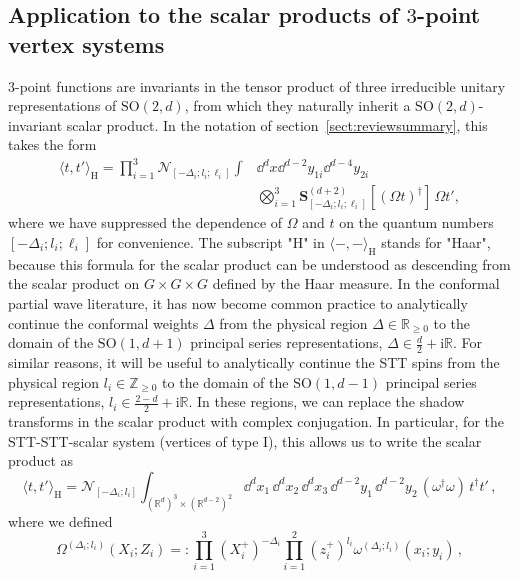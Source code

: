 \documentclass{article}
\def \Dg {\Delta}
\def \Zs {\mathbb{Z}}
\def \Rs {\mathbb{R}}
\begin{document}
\subsection{Application to the scalar products of \texorpdfstring{$3$}{3}-point vertex systems}
$3$-point functions are invariants in the tensor product of three irreducible unitary representations of $\mathrm{SO}(2,d)$, from which they naturally inherit a $\mathrm{SO}(2,d)$-invariant scalar product. In the notation of section~\ref{sect:reviewsummary}, this takes the form
\begin{align*}
    \langle t, t' \rangle_{\mathrm{H}} = \prod_{i=1}^3 \mathcal{N}_{[-\Dg_i;l_i;\ell_i]} \int & \dd^dx\dd^{d-2} y_{1i} \dd^{d-4} y_{2i}  \\
    & \bigotimes_{i=1}^3 \mathbf{S}^{(d+2)}_{[-\Dg_i;l_i;\ell_i]} \left[(\Omega t)^{\dagger}\right] \,  \Omega t',
\end{align*}
where we have suppressed the dependence of $\Omega$ and $t$ on the quantum numbers $[-\Dg_i;l_i;\ell_i]$ for convenience. The subscript "H" in $\langle -,-\rangle_{\mathrm{H}}$ stands for "Haar", because this formula for the scalar product can be understood as descending from the scalar product on $G\times G \times G$ defined by the Haar measure. In the conformal partial wave literature, it has now become common practice to analytically continue the conformal weights $\Dg$ from the physical region $\Dg \in \Rs_{\geq 0}$ to the domain of the $\mathrm{SO}(1,d+1)$ principal series representations, $\Dg \in \frac{d}{2}+ \mathrm{i} \Rs$. For similar reasons, it will be useful to analytically continue the STT spins from the physical region $l_i \in \Zs_{\geq 0}$ to the domain of the $\mathrm{SO}(1,d-1)$ principal series representations, $l_i \in \frac{2-d}{2}+\mathrm{i} \Rs$. In these regions, we can replace the shadow transforms in the scalar product with complex conjugation. In particular, for the STT-STT-scalar system (vertices of type I), this allows us to write the scalar product as
\begin{equation}
    \langle t, t' \rangle_{\mathrm{H}} = \mathcal{N}_{[-\Dg_i;l_i]} \int_{(\Rs^d)^3 \times (\Rs^{d-2})^2}  \dd^d x_1\,\dd^d x_2\,\dd^dx_3\,\dd^{d-2}y_1\,\dd^{d-2}y_2 \, (\omega^{\dagger} \omega) \, t^{\dagger}t'\,,
    \label{basicSP}
\end{equation}
where we defined
\begin{equation}
    \Omega^{(\Dg_i;l_i)}(X_i;Z_i) =: \prod_{i=1}^3 (X_{i}^+)^{-\Dg_i} \prod_{i=1}^2 (z_i^+)^{l_i}  \omega^{(\Dg_i;l_i)}(x_i;y_i)\,,
\end{equation}
\end{document}
